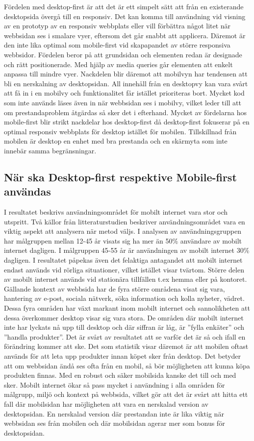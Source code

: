 \documentclass[11pt]{article}
\begin{document}
Fördelen med desktop-first är att det är ett simpelt sätt att från en existerande desktopsida övergå till en responsiv. Det kan komma till användning vid visning av en prototyp av en responsiv webbplats eller vill förbättra något litet när webbsidan ses i smalare vyer, eftersom det går snabbt att applicera. Däremot är den inte lika optimal som mobile-first vid skapapandet av större responsiva webbsidor. Fördelen beror på att grundsidan och elementen redan är designade och rätt positionerade. Med hjälp av media queries går elementen att enkelt anpassa till mindre vyer. Nackdelen blir däremot att mobilvyn har tendensen att bli en nerskalning av desktopsidan. All innehåll från en desktopvy kan vara svårt att få in i en mobilvy och funktionalitet får istället prioriteras bort. Mycket kod som inte används läses även in när webbsidan ses i mobilvy, vilket leder till att om prestandaproblem åtgärdas så sker det i efterhand. Mycket av fördelarna hos mobile-first blir strikt nackdelar hos desktop-first då desktop-first fokuserar på en optimal responsiv webbplats för desktop istället för mobilen. Tillskillnad från mobilen är desktop en enhet med bra prestanda och en skärmyta som inte innebär samma begränsningar.

\subsection{När ska Desktop-first respektive Mobile-first användas}
I resultatet beskrivs användningsområdet för mobilt internet vara stor och utspritt. Två källor från litteraturstudien beskriver användningsområdet vara en viktig aspekt att analysera när metod väljs. I analysen av användningsgruppen har målgruppen mellan 12-45 år visats sig ha mer än 50\% användare av mobilt internet dagligen. I målgruppen 45-55 år är användningen av mobilt internet 30\% dagligen. I resultatet påpekas även det felaktiga antagandet att mobilt internet endast används vid rörliga situationer, vilket istället visar tvärtom. Större delen av mobilt internet används vid stationära tillfällen t.ex hemma eller på kontoret. Gällande kontext av webbsida har de fyra större områdena visat sig vara, hantering av e-post, sociala nätverk, söka information och kolla nyheter, vädret.  Dessa fyra områden har växt markant inom mobilt internet och sannolikheten att dessa överkommer desktop visar sig vara stora. De områden där mobilt internet inte har lyckats nå upp till desktop och där siffran är låg, är ”fylla enkäter” och ”handla produkter”. Det är svårt av resultatet att se varför det är så och ifall en förändring kommer att ske. Det som statistik visar däremot är att mobilen oftast används för att leta upp produkter innan köpet sker från desktop. Det betyder att om webbsidan ändå ses ofta från en mobil, så bör möjligheten att kunna köpa produkten finnas. Med en robust och säker mobilsida kanske det till och med sker. Mobilt internet ökar så pass mycket i användning i alla områden för målgrupp,  miljö och kontext på webbsida, vilket gör att det är svårt att hitta ett fall där mobilsidan har möjligheten att vara en nerskalad version av desktopsidan. En nerskalad version där prestandan inte är lika viktig när webbsidan ses från mobilen och där mobilsidan agerar mer som bonus för desktopsidan.
\end{document}
